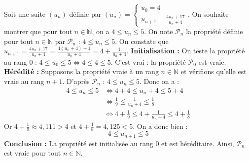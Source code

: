 	\begin{tip}[Exemple]
		\contentwidth[big]
		Soit une suite $(u_n)$ définie par $(u_n) = \begin{cases} u_0 = 4\\ u_{n+1} = \frac{4u_n + 17}{u_n + 4}\end{cases}$. On souhaite montrer que pour tout $n \in \mathbb{N}$, on a $4 \leq u_n \leq 5$.
		\newpar
		On note $\mathcal{P}_n$ la propriété définie pour tout $n \in \mathbb{N}$ par $\mathcal{P}_n$ : $4 \leq u_n \leq 5$.
		\newpar
		On constate que $u_{n+1} = \frac{4u_n + 17}{u_n + 4} = \frac{4(u_n + 4) + 1}{u_n + 4} = 4 + \frac{1}{u_n + 4}$.
		\newpar
		\textbf{Initialisation :} On teste la propriété au rang $0$ : $4 \leq u_0 \leq 5 \iff 4 \leq 4 \leq 5$. C'est vrai : la propriété $\mathcal{P}_0$ est vraie.
		\newpar
		\textbf{Hérédité :} Supposons la propriété vraie à un rang $n \in \mathbb{N}$ et vérifions qu'elle est vraie au rang $n+1$.
		\newpar
		D'après $\mathcal{P}_n$ : $4 \leq u_n \leq 5$. Donc on a :
		\begin{align*}
			4 \leq u_n \leq 5 &\iff 4 + 4 \leq u_n + 4 \leq 5 + 4 \\
			&\iff \frac{1}{9} \leq \frac{1}{u_n + 4} \leq \frac{1}{8} \\
			&\iff 4 + \frac{1}{9} \leq 4 + \frac{1}{u_n + 4} \leq 4 + \frac{1}{8}
		\end{align*}
		Or $4 + \frac{1}{9} \approx 4,111 > 4$ et $4 + \frac{1}{8} = 4,125 < 5$. On a donc bien :
		\[ 4 \leq u_{n+1} \leq 5 \]
		\textbf{Conclusion :} La propriété est initialisée au rang $0$ et est héréditaire. Ainsi, $\mathcal{P}_n$ est vraie pour tout $n \in \mathbb{N}$.
	\end{tip}

